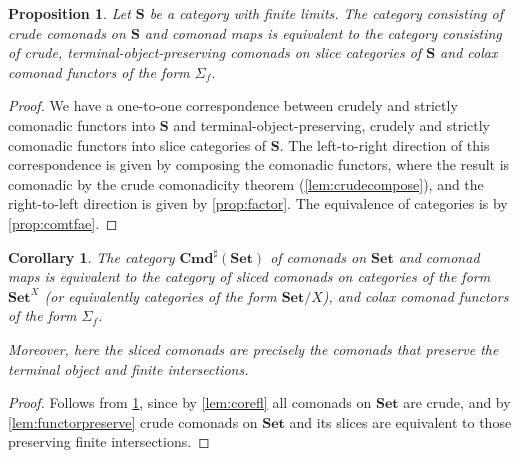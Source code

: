\documentclass[11pt, oneside, article]{memoir}
\theoremstyle{plain}
\newtheorem{corollary}[theorem]{Corollary}
\newtheorem{proposition}[theorem]{Proposition}
\theoremstyle{definition}
\theoremstyle{remark}
\DeclarePairedDelimiter{\abs}{\lvert}{\rvert}
\newcommand{\bang}{\mathrm{!}}
\newcommand{\namedcat}[1]{\mathbf{#1}}
\newcommand{\cat}[1]{\mathbf{#1}}
\newcommand{\Set}{\namedcat{Set}}
\newcommand{\Com}{\namedcat{Cmd}^\sharp}
\newcommand{\CoalgOn}[2]{{#2}^{#1}}
\newcommand{\CoalgS}[1]{\CoalgOn{#1}{\bS}}
\newcommand{\clift}[1]{\overline{#1}}
\newcommand{\pts}[1]{{\abs{#1}}}
\newcommand{\ptlift}[1]{\overline{#1}}
\newcommand{\carr}{\Sigma}
\newcommand{\leindex}[1]{\Sigma_{#1}}
\newcommand{\slicel}{\Sigma_\bang}
\newcommand{\slicer}{\Delta_\bang}
\newcommand{\car}[1]{\carr^{#1}}
\newcommand{\carC}{\car{\cC}}
\newcommand{\cmnd}[1]{{#1}}
\newcommand{\xX}{X}
\newcommand{\cC}{\cmnd{C}}
\newcommand{\bS}{\cat{S}}
\newcommand{\CS}{\CoalgS{\cC}}
\newcommand{\SC}{\bS/\pts{\cC}}
\begin{document}
\begin{proposition}\label{prop:objective}
  Let $\bS$ be a category with finite limits. The category consisting
  of crude comonads on $\bS$ and comonad maps is equivalent to the
  category consisting of crude, terminal-object-preserving comonads on
  slice categories of $\bS$ and colax comonad functors of the form
  $\leindex{f}$.
\end{proposition}
\begin{proof}
  We have a one-to-one correspondence between crudely and strictly
  comonadic functors into $\bS$ and terminal-object-preserving,
  crudely and strictly comonadic functors into slice categories of
  $\bS$. The left-to-right direction of this correspondence is given
  by composing the comonadic functors, where the result is comonadic
  by the crude comonadicity theorem (\cref{lem:crudecompose}), and the
  right-to-left direction is given by \cref{prop:factor}. The
  equivalence of categories is by \cref{prop:comtfae}.
\end{proof}

\begin{corollary}\label{cor:setslices}
  The category $\Com(\Set)$ of comonads on $\Set$ and comonad maps is
  equivalent to the category of sliced comonads on categories of the
  form $\Set^\xX$ (or equivalently categories of the form $\Set/\xX$),
  and colax comonad functors of the form $\leindex{f}$.

  Moreover, here the sliced comonads are precisely the comonads that
  preserve the terminal object and finite intersections.
\end{corollary}
\begin{proof}
  Follows from \cref{prop:objective}, since by
  \cref{lem:corefl} all comonads on $\Set$ are crude, and by
  \cref{lem:functorpreserve} crude comonads on $\Set$ and its slices
  are equivalent to those preserving finite intersections.
\end{proof}
\end{document}
